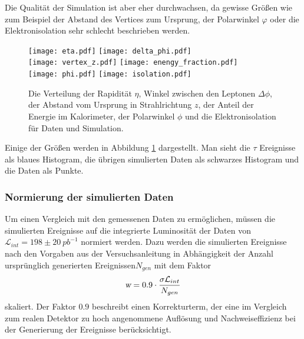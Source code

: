 \documentclass[a4paper,12pt]{article}
\begin{document}
Die Qualität der Simulation ist aber eher durchwachsen, da gewisse Größen wie zum Beispiel der
Abstand des Vertices zum Ursprung, der Polarwinkel $φ$ oder die Elektronisolation sehr schlecht
beschrieben werden.

\begin{figure}[h]
	\centering
	\newcommand{\halftext}{0.49\textwidth}
	\texttt{[image: eta.pdf]}
	\texttt{[image: delta\_phi.pdf]}\\
	\texttt{[image: vertex\_z.pdf]}
	\texttt{[image: enengy\_fraction.pdf]}\\
	\texttt{[image: phi.pdf]}
	\texttt{[image: isolation.pdf]}\\
	\caption{Die Verteilung der Rapidität $η$, Winkel zwischen den Leptonen $Δ\phi$, der Abstand vom Ursprung in
	Strahlrichtung $z$, der Anteil der Energie im Kalorimeter, der Polarwinkel $\phi$ und die
	Elektronisolation für Daten und Simulation. }
	\label{fig:variables}
\end{figure}

Einige der Größen werden in Abbildung \ref{fig:variables} dargestellt. Man sieht die $τ$ Ereignisse
als blaues Histogram, die übrigen simulierten Daten als schwarzes Histogram und die Daten als
Punkte. 
\subsubsection*{Normierung der simulierten Daten}
Um einen Vergleich mit den gemessenen Daten zu ermöglichen, müssen die simulierten Ereignisse auf
die 
integrierte Luminosität der Daten von $\mathcal{L}_{int}=198 \pm \SI{20}{pb^{-1}}$ normiert werden.
Dazu werden die simulierten Ereignisse nach den Vorgaben aus der Versuchsanleitung\cite{versuchsanleitung}
in Abhängigkeit der Anzahl ursprünglich generierten Ereignissen$N_{gen}$ mit dem Faktor
\begin{align*}
	\textsl{w}= 0.9 \cdot \frac{\sigma \mathcal{L}_{int}}{N_{gen}}
\end{align*}
skaliert. Der Faktor $0.9$ beschreibt einen Korrekturterm, der eine im Vergleich zum realen Detektor
zu hoch angenommene Auflösung und Nachweiseffizienz bei der Generierung der Ereignisse berücksichtigt.
\end{document}

